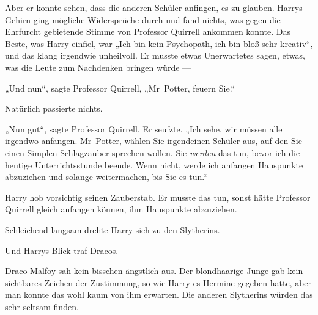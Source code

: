 Aber er konnte sehen, dass die anderen Schüler anfingen, es zu glauben. Harrys Gehirn ging mögliche Widersprüche durch und fand nichts, was gegen die Ehrfurcht gebietende Stimme von Professor Quirrell ankommen konnte. Das Beste, was Harry einfiel, war
„Ich bin kein Psychopath, ich bin bloß sehr kreativ“, und das klang irgendwie unheilvoll. Er musste etwas Unerwartetes sagen, etwas, was die Leute zum Nachdenken bringen würde —

„Und nun“, sagte Professor Quirrell,
„Mr~Potter, feuern Sie.“

Natürlich passierte nichts.

„Nun gut“, sagte Professor Quirrell. Er seufzte.
„Ich sehe, wir müssen alle irgendwo anfangen. Mr~Potter, wählen Sie irgendeinen Schüler aus, auf den Sie einen Simplen Schlagzauber sprechen wollen. Sie \emph{werden} das tun, bevor ich die heutige Unterrichtsstunde beende. Wenn nicht, werde ich anfangen Hauspunkte abzuziehen und solange weitermachen, bis Sie es tun.“

Harry hob vorsichtig seinen Zauberstab. Er musste das tun, sonst hätte Professor Quirrell gleich anfangen können, ihm Hauspunkte abzuziehen.

Schleichend langsam drehte Harry sich zu den Slytherins.

Und Harrys Blick traf Dracos.

Draco Malfoy sah kein bisschen ängstlich aus. Der blondhaarige Junge gab kein sichtbares Zeichen der Zustimmung, so wie Harry es Hermine gegeben hatte, aber man konnte das wohl kaum von ihm erwarten. Die anderen Slytherins würden das sehr seltsam finden.


